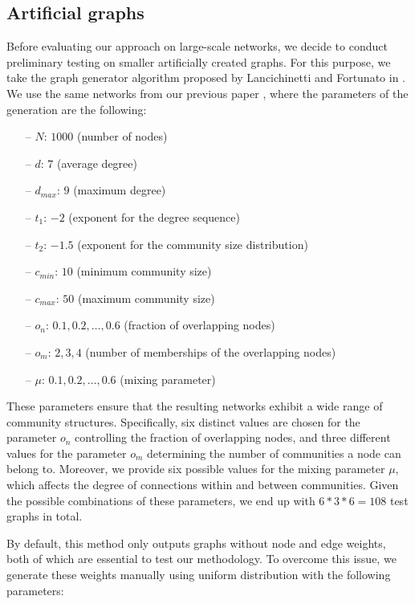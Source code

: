 \documentclass[pdflatex,sn-mathphys-num]{sn-jnl}
\begin{document}

\subsection{Artificial graphs}\label{subsec_artificial}

Before evaluating our approach on large-scale networks, we decide to conduct preliminary testing on smaller artificially created graphs. For this purpose, we take the graph generator algorithm proposed by Lancichinetti and Fortunato in \cite{fortunato}. We use the same networks from our previous paper \cite{evaluating}, where the parameters of the generation are the following:

\begin{itemize}
    \item[--] $N$: $1000$ (number of nodes)
    \item[--] $d$: $7$ (average degree)
    \item[--] $d_{max}$: $9$ (maximum degree)
    \item[--] $t_1$: $-2$ (exponent for the degree sequence)
    \item[--] $t_2$: $-1.5$ (exponent for the community size distribution)
    \item[--] $c_{min}$: $10$ (minimum community size)
    \item[--] $c_{max}$: $50$ (maximum community size)
    \item[--] $o_n$: $0.1, 0.2, \dots, 0.6$ (fraction of overlapping nodes)
    \item[--] $o_m$: $2, 3, 4$ (number of memberships of the overlapping nodes)
    \item[--] $\mu$: $0.1, 0.2, \dots, 0.6$ (mixing parameter)
\end{itemize}

These parameters ensure that the resulting networks exhibit a wide range of community structures. Specifically, six distinct values are chosen for the parameter $o_n$ controlling the fraction of overlapping nodes, and three different values for the parameter $o_m$ determining the number of communities a node can belong to. Moreover, we provide six possible values for the mixing parameter $\mu$, which affects the degree of connections within and between communities. Given the possible combinations of these parameters, we end up with $6*3*6 = 108$ test graphs in total.

By default, this method only outputs graphs without node and edge weights, both of which are essential to test our methodology. To overcome this issue, we generate these weights manually using uniform distribution with the following parameters:
\end{document}
